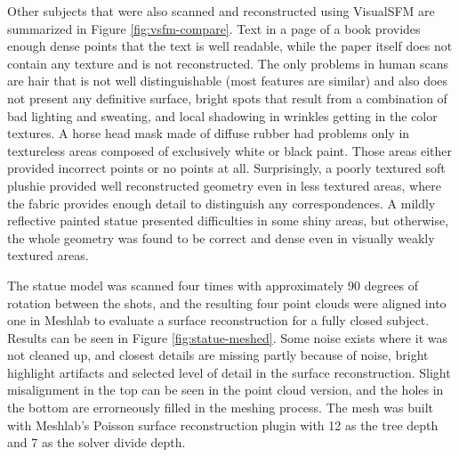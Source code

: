 
Other subjects that were also scanned and reconstructed using VisualSFM are summarized in Figure \ref{fig:vsfm-compare}.
Text in a page of a book provides enough dense points that the text is well readable, while the paper itself does not contain any texture and is not reconstructed.
The only problems in human scans are hair that is not well distinguishable (most features are similar) and also does not present any definitive surface, bright spots that result from a combination of bad lighting and sweating, and local shadowing in wrinkles getting in the color textures.
A horse head mask made of diffuse rubber had problems only in textureless areas composed of exclusively white or black paint.
Those areas either provided incorrect points or no points at all.
Surprisingly, a poorly textured soft plushie provided well reconstructed geometry even in less textured areas, where the fabric provides enough detail to distinguish any correspondences.
A mildly reflective painted statue presented difficulties in some shiny areas, but otherwise, the whole geometry was found to be correct and dense even in visually weakly textured areas.


The statue model was scanned four times with approximately 90 degrees of rotation between the shots, and the resulting four point clouds were aligned into one in Meshlab to evaluate a surface reconstruction for a fully closed subject.
Results can be seen in Figure \ref{fig:statue-meshed}.
Some noise exists where it was not cleaned up, and closest details are missing partly because of noise, bright highlight artifacts and selected level of detail in the surface reconstruction.
Slight misalignment in the top can be seen in the point cloud version, and the holes in the bottom are errorneously filled in the meshing process.
The mesh was built with Meshlab's Poisson surface reconstruction plugin with 12 as the tree depth and 7 as the solver divide depth.

